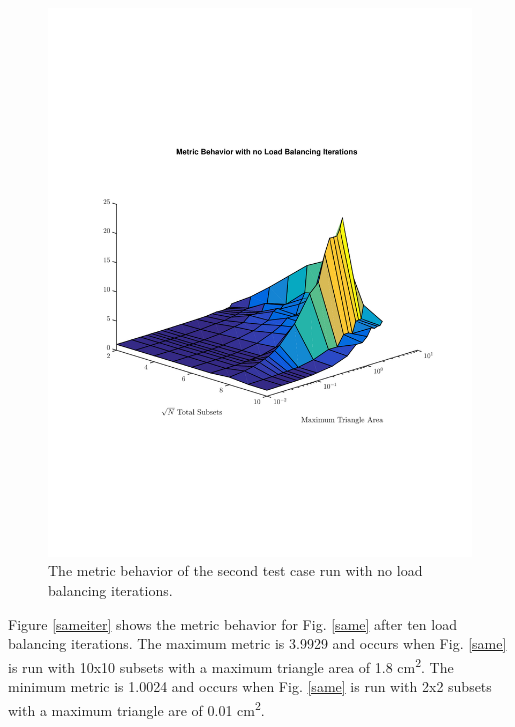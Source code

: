 \documentclass{anstrans}
\begin{document}
\begin{figure}[H]
\centering
\includegraphics[scale=0.5, trim = 2cm 6cm 2cm 7cm,clip]{figures/SameNoIter.pdf}
\caption{The metric behavior of the second test case run with no load balancing iterations.}
\label{samenoiter}
\end{figure}

Figure \ref{sameiter} shows the metric behavior for Fig. \ref{same} after ten load balancing iterations. The maximum metric is 3.9929 and occurs when Fig. \ref{same} is run with 10x10 subsets with a maximum triangle area of 1.8 cm\textsuperscript{2}. The minimum metric is 1.0024 and occurs when Fig. \ref{same} is run with 2x2 subsets with a maximum triangle are of 0.01 cm\textsuperscript{2}.
\end{document}
